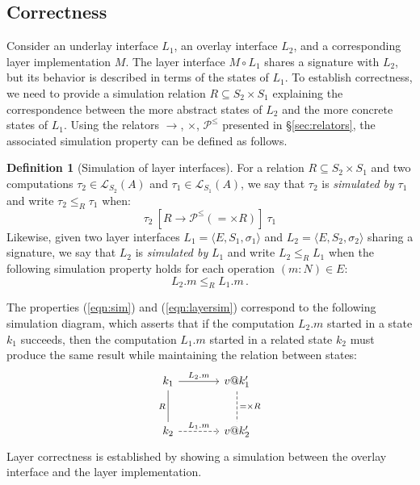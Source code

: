 \documentclass[11pt,oneside,draft]{book}
\theoremstyle{definition}
\newtheorem{definition}[theorem]{Definition}
\begin{document}

\subsection{Correctness} %

Consider an underlay interface $L_1$,
an overlay interface $L_2$,
and a corresponding layer implementation $M$.
The layer interface $M \circ L_1$
shares a signature with $L_2$,
but its behavior is described in terms of
the states of $L_1$.
To establish correctness,
we need to provide a simulation relation
$R \subseteq S_2 \times S_1$
explaining the correspondence between
the more abstract states of $L_2$ and
the more concrete states of $L_1$.
Using the relators $\rightarrow$, $\times$, $\mathcal{P}^\le$
presented in \S\ref{sec:relators},
the associated simulation property can be defined as follows.

\begin{definition}[Simulation of layer interfaces] %
For a relation $R \subseteq S_2 \times S_1$
and two computations
$\tau_2 \in \mathcal{L}_{S_2}(A)$ and
$\tau_1 \in \mathcal{L}_{S_1}(A)$,
we say that $\tau_2$ is \emph{simulated by} $\tau_1$
and write $\tau_2 \le_R \tau_1$
when:
\begin{equation} \label{eqn:sim}
  \tau_2
  \: \mathrel{[R \rightarrow \mathcal{P}^\le({=} \times R)]} \:
  \tau_1
\end{equation}
Likewise,
given two layer interfaces
$L_1 = \langle E, S_1, \sigma_1 \rangle$ and
$L_2 = \langle E, S_2, \sigma_2 \rangle$
sharing a signature,
we say that $L_2$ is \emph{simulated by} $L_1$
and write $L_2 \le_R L_1$ when
the following simulation property holds
for each operation $(m \mathop: N) \in E$:
\begin{equation}
  \label{eqn:layersim}
  L_2.m \le_R L_1.m
  \,.
\end{equation}
\end{definition}

The properties (\ref{eqn:sim}) and (\ref{eqn:layersim})
correspond to the following simulation diagram,
which asserts that if the computation $L_2.m$
started in a state $k_1$ succeeds,
then the computation $L_1.m$
started in a related state $k_2$ must produce
the same result
while maintaining the relation between states:
\[
  \begin{tikzcd}[sep=large]
    k_1 \ar[r, "L_2.m"] \ar[d, "R"', dash] &
    v@k_1' \ar[d, "{=} \times R", dash, dashed] \\
    k_2 \ar[r, "L_1.m", dashed] &
    v@k_2'
  \end{tikzcd}
\]
Layer correctness is established by showing
a simulation between the overlay interface
and the layer implementation.
\end{document}
